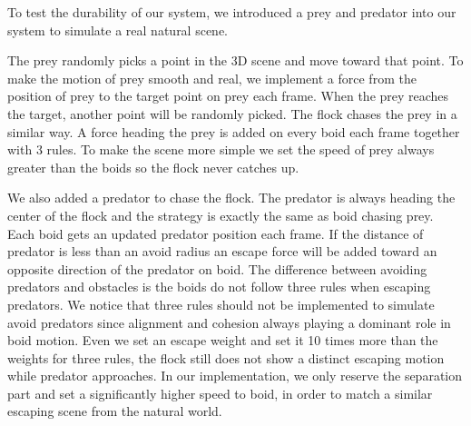 To test the durability of our system, we introduced a prey and predator into our system to simulate a real natural scene.

The prey randomly picks a point in the 3D scene and move toward that point. To make the motion of prey smooth and real, we implement a force from the position of prey to the target point on prey each frame. When the prey reaches the target, another point will be randomly picked. The flock chases the prey in a similar way. A force heading the prey is added on every boid each frame together with 3 rules. To make the scene more simple we set the speed of prey always greater than the boids so the flock never catches up. 

We also added a predator to chase the flock. The predator is always heading the center of the flock and the strategy is exactly the same as boid chasing prey. Each boid gets an updated predator position each frame. If the distance of predator is less than an avoid radius an escape force will be added toward an opposite direction of the predator on boid. The difference between avoiding predators and obstacles is the boids do not follow three rules when escaping predators. We notice that three rules should not be implemented to simulate avoid predators since alignment and cohesion always playing a dominant role in boid motion. Even we set an escape weight and set it 10 times more than the weights for three rules, the flock still does not show a distinct escaping motion while predator approaches. In our implementation, we only reserve the separation part and set a significantly higher speed to boid, in order to match a similar escaping scene from the natural world.
